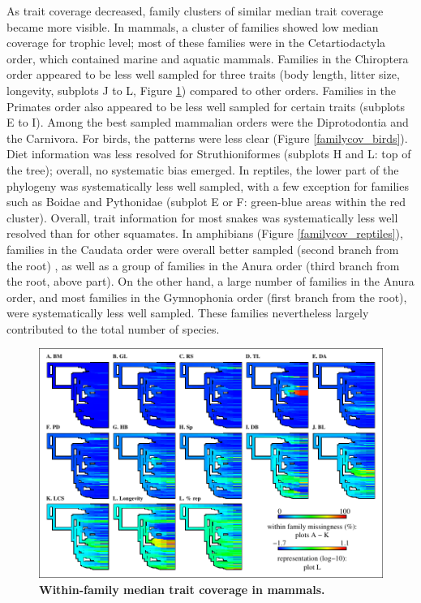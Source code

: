 As trait coverage decreased, family clusters of similar median trait coverage became more visible. In mammals, a cluster of families showed low median coverage for trophic level; most of these families were in the Cetartiodactyla order, which contained marine and aquatic mammals. Families in the Chiroptera order appeared to be less well sampled for three traits (body length, litter size, longevity, subplots J to L, Figure \ref{familycov_mammals}) compared to other orders. Families in the Primates order also appeared to be less well sampled for certain traits (subplots E to I). Among the best sampled mammalian orders were the Diprotodontia and the Carnivora. For birds, the patterns were less clear (Figure \ref{familycov_birds}). Diet information was less resolved for Struthioniformes (subplots H and L: top of the tree); overall, no systematic bias emerged.
 In reptiles, the lower part of the phylogeny was systematically less well sampled, with a few exception for families such as Boidae and Pythonidae (subplot E or F: green-blue areas within the red cluster). Overall, trait information for most snakes was systematically less well resolved than for other squamates.
In amphibians (Figure \ref{familycov_reptiles}), families in the Caudata order were overall better sampled  (second branch from the root) , as well as a group of families in the Anura order (third branch from the root, above part). On the other hand, a large number of families in the Anura order, and most families in the Gymnophonia order (first branch from the root), were systematically less well sampled. These families nevertheless largely contributed to the total number of species. 

\pagebreak

\begin{figure}[h!]
\centering
\includegraphics[scale=1]{figures/chapter2/NA_phylo_patterns/Mammals_coverage}
\caption[Within-family median trait coverage in mammals]{\textbf{Within-family median trait coverage in mammals.}}
\label{familycov_mammals}
\end{figure}


